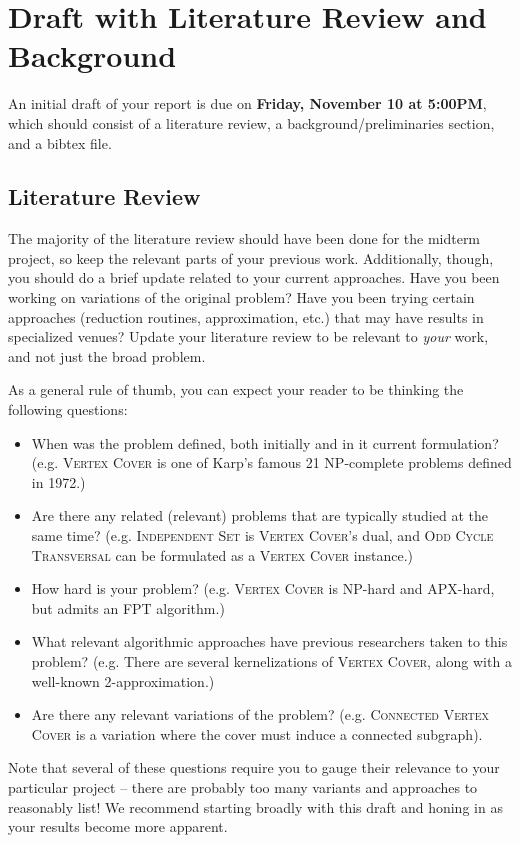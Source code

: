 \documentclass{article}
\begin{document}
\section*{Draft with Literature Review and Background}
An initial draft of your report is due on \textbf{Friday, November 10 at 5:00PM}, which should consist of a literature review, a background/preliminaries section, and a bibtex file.

\subsection*{Literature Review}
The majority of the literature review should have been done for the midterm project, so keep the relevant parts of your previous work. Additionally, though, you should do a brief update related to your current approaches. Have you been working on variations of the original problem? Have you been trying certain approaches (reduction routines, approximation, etc.) that may have results in specialized venues? Update your literature review to be relevant to \emph{your} work, and not just the broad problem.

As a general rule of thumb, you can expect your reader to be thinking the following questions:

\begin{itemize}
\item When was the problem defined, both initially and in it current formulation? (e.g. \textsc{Vertex Cover} is one of Karp's famous 21 NP-complete problems defined in 1972.)
\item Are there any related (relevant) problems that are typically studied at the same time? (e.g. \textsc{Independent Set} is \textsc{Vertex Cover}'s dual, and \textsc{Odd Cycle Transversal} can be formulated as a \textsc{Vertex Cover} instance.)
\item How hard is your problem? (e.g. \textsc{Vertex Cover} is NP-hard and APX-hard, but admits an FPT algorithm.)
\item What relevant algorithmic approaches have previous researchers taken to this problem? (e.g. There are several kernelizations of \textsc{Vertex Cover}, along with a well-known 2-approximation.)
\item Are there any relevant variations of the problem? (e.g. \textsc{Connected Vertex Cover} is a variation where the cover must induce a connected subgraph).
\end{itemize}

Note that several of these questions require you to gauge their relevance to your particular project -- there are probably too many variants and approaches to reasonably list! We recommend starting broadly with this draft and honing in as your results become more apparent.
\end{document}
